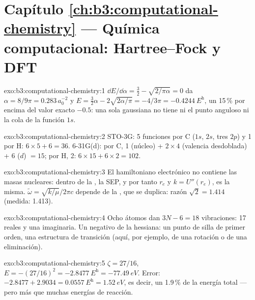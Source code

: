 \section*{Capítulo \ref{ch:b3:computational-chemistry} --- Química computacional: Hartree--Fock y DFT}

\begin{solution}{exo:b3:computational-chemistry:1}
$\dd E/\dd\alpha = \frac32 - \sqrt{2/\pi\alpha} = 0$ da $\alpha = 8/9\pi = 0.283\,
a_0^{-2}$ y $E = \frac32\alpha - 2\sqrt{2\alpha/\pi} = -4/3\pi = \qty{-0.4244}{\hartree}$,
un 15\,\% por encima del valor exacto $-0.5$: una sola gaussiana no tiene ni el punto anguloso ni la
cola de la función $1s$.
\end{solution}

\begin{solution}{exo:b3:computational-chemistry:2}
STO-3G: 5 funciones por C ($1s$, $2s$, tres $2p$) y 1 por H: $6 \times 5 + 6 =
36$. 6-31G(d): por C, 1 (núcleo) + $2 \times 4$ (valencia desdoblada) + 6 ($d$) $= 15$;
por H, 2: $6 \times 15 + 6 \times 2 = 102$.
\end{solution}

\begin{solution}{exo:b3:computational-chemistry:3}
El hamiltoniano electrónico no contiene las masas nucleares: dentro de la
, la SEP, y por tanto $r_e$ y $k = U''(r_e)$, es la
misma. $\tilde\omega = \sqrt{k/\mu}/2\pi c$ depende de la , que se
duplica: razón $\sqrt2 = 1.414$ (medida: 1.413).
\end{solution}

\begin{solution}{exo:b3:computational-chemistry:4}
Ocho átomos dan $3N - 6 = 18$ vibraciones: 17 reales y una imaginaria. Un
 negativo de la hessiana: un punto de silla de primer orden, una estructura
de transición (aquí, por ejemplo, de una rotación o de una eliminación).
\end{solution}

\begin{solution}{exo:b3:computational-chemistry:5}
$\zeta = 27/16$, $E = -(27/16)^2 = \qty{-2.8477}{\hartree} = \qty{-77.49}{eV}$.
Error: $-2.8477 + 2.9034 = \qty{0.0557}{\hartree} = \qty{1.52}{eV}$, es decir,
un 1.9\,\% de la energía total ---pero más que muchas energías de reacción.
\end{solution}

